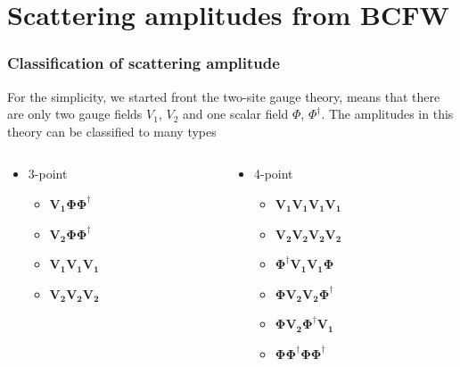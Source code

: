 \documentclass{beamer}
\begin{document}
\section{Scattering amplitudes from BCFW}
\begin{frame}
    \frametitle{Classification of scattering amplitude}
    For the simplicity, we started front the two-site gauge theory, means that there are only two gauge fields $V_1$, $V_2$ and one scalar field $\Phi$, $\Phi^\dagger$.
    The amplitudes in this theory can be classified to many types
    \begin{columns}[T]
        \begin{column}{0.48\textwidth}
            \begin{itemize}
                \item 3-point
                    \begin{itemize}
                        \item $\bm{V_1\Phi\Phi^\dagger}$
                        \item $\bm{V_2\Phi\Phi^\dagger}$
                        \item $\bm{V_1V_1V_1}$
                        \item $\bm{V_2V_2V_2}$
                    \end{itemize}
            \end{itemize}
        \end{column}
        \begin{column}{0.48\textwidth}
            \begin{itemize}
                \item 4-point
                \begin{itemize}
                    \item $\bm{V_1V_1V_1V_1}$
                    \item $\bm{V_2V_2V_2V_2}$
                    \item $\bm{\Phi^\dagger V_1V_1\Phi}$
                    \item $\bm{\Phi V_2V_2\Phi^\dagger}$
                    \item $\bm{\Phi V_2 \Phi^\dagger V_1}$
                    \item $\bm{\Phi\Phi^\dagger\Phi\Phi^\dagger}$
                \end{itemize}
            \end{itemize}
        \end{column}
    \end{columns}
\end{frame}
\end{document}
